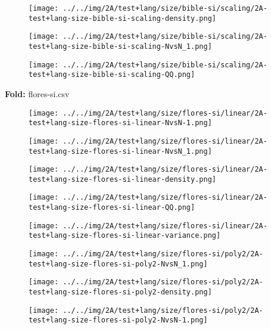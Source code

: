\begin{figure}[H]
\centering	\texttt{[image: ../../img/2A/test+lang/size/bible-si/scaling/2A-test+lang-size-bible-si-scaling-density.png]}
\end{figure}
\begin{figure}[H]
\centering	\texttt{[image: ../../img/2A/test+lang/size/bible-si/scaling/2A-test+lang-size-bible-si-scaling-NvsN\_1.png]}
\end{figure}
\begin{figure}[H]
\centering	\texttt{[image: ../../img/2A/test+lang/size/bible-si/scaling/2A-test+lang-size-bible-si-scaling-QQ.png]}
\end{figure}
\textbf{Fold:} flores-si.csv
\begin{figure}[H]
\centering	\texttt{[image: ../../img/2A/test+lang/size/flores-si/linear/2A-test+lang-size-flores-si-linear-NvsN-1.png]}
\end{figure}
\begin{figure}[H]
\centering	\texttt{[image: ../../img/2A/test+lang/size/flores-si/linear/2A-test+lang-size-flores-si-linear-NvsN\_1.png]}
\end{figure}
\begin{figure}[H]
\centering	\texttt{[image: ../../img/2A/test+lang/size/flores-si/linear/2A-test+lang-size-flores-si-linear-density.png]}
\end{figure}
\begin{figure}[H]
\centering	\texttt{[image: ../../img/2A/test+lang/size/flores-si/linear/2A-test+lang-size-flores-si-linear-QQ.png]}
\end{figure}
\begin{figure}[H]
\centering	\texttt{[image: ../../img/2A/test+lang/size/flores-si/linear/2A-test+lang-size-flores-si-linear-variance.png]}
\end{figure}
\begin{figure}[H]
\centering	\texttt{[image: ../../img/2A/test+lang/size/flores-si/poly2/2A-test+lang-size-flores-si-poly2-NvsN\_1.png]}
\end{figure}
\begin{figure}[H]
\centering	\texttt{[image: ../../img/2A/test+lang/size/flores-si/poly2/2A-test+lang-size-flores-si-poly2-density.png]}
\end{figure}
\begin{figure}[H]
\centering	\texttt{[image: ../../img/2A/test+lang/size/flores-si/poly2/2A-test+lang-size-flores-si-poly2-NvsN-1.png]}
\end{figure}
